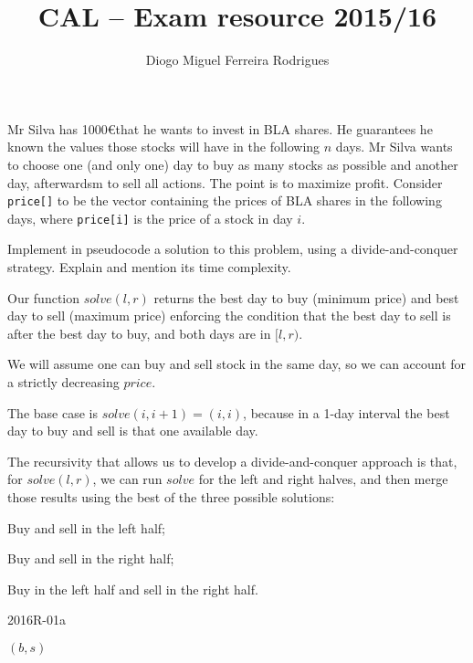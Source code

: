 \documentclass{cal}
\title{CAL -- Exam resource 2015/16}
\author{Diogo Miguel Ferreira Rodrigues \\ \email{dmfrodrigues2000@gmail.com}}
\begin{document}
{
\renewcommand{\thechapter}{\arabic{chapter}R}
\setcounter{chapter}{15}

Mr Silva has 1000\euro that he wants to invest in BLA shares. He guarantees he known the values those stocks will have in the following $n$ days. Mr Silva wants to choose one (and only one) day to buy as many stocks as possible and another day, afterwardsm to sell all actions. The point is to maximize profit. Consider \texttt{price[]} to be the vector containing the prices of BLA shares in the following days, where \texttt{price[i]} is the price of a stock in day $i$.

Implement in pseudocode a solution to this problem, using a divide-and-conquer strategy. Explain and mention its time complexity.

\ansseparator

Our function $solve(l,r)$ returns the best day to buy (minimum price) and best day to sell (maximum price) enforcing the condition that the best day to sell is after the best day to buy, and both days are in $[l,r)$.

We will assume one can buy and sell stock in the same day, so we can account for a strictly decreasing $price$.

The base case is $solve(i, i+1)=(i,i)$, because in a 1-day interval the best day to buy and sell is that one available day.

The recursivity that allows us to develop a divide-and-conquer approach is that, for $solve(l,r)$, we can run $solve$ for the left and right halves, and then merge those results using the best of the three possible solutions:
\begin{enumerate*}
    \item Buy and sell in the left half;
    \item Buy and sell in the right half;
    \item Buy in the left half and sell in the right half.
\end{enumerate*}

\begin{algorithm}[H]
    \caption{2016R-01a}
    \begin{algorithmic}[1]
            \EndIf
            \EndIf
            \EndIf
            \EndIf
            \State \Return $(b, s)$
        \EndFunction
    \end{algorithmic}
\end{algorithm}

}
\end{document}
